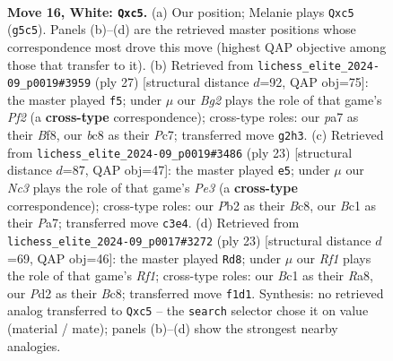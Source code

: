 \documentclass[11pt]{article}
\begin{document}
\clearpage

\begin{figure}[p]\centering
\begin{subfigure}{0.46\textwidth}\centering
\resizebox{\linewidth}{!}{%
\newchessgame
\chessboard[
  setfen={r1bq1r1k/pp1pppbp/3n4/2p3Q1/2P5/2N2N2/PP1P1PBP/R1B2RK1 w - - 5 16},
  showmover=false,
  pgfstyle=straightmove, color=movearrow, markmove={g5-c5}
]}
\caption{}
\end{subfigure}\hfill
\begin{subfigure}{0.46\textwidth}\centering
\resizebox{\linewidth}{!}{%
\newchessgame
\chessboard[
  setfen={2kr1b1r/pppb1pp1/2n4p/7q/3PB3/4PPP1/PPN4P/R1BQ1RK1 b - - 2 14},
  showmover=false,
  pgfstyle=straightmove, color=movearrow, markmove={f7-f5}
]}
\caption{}
\end{subfigure}
\\[4pt]
\begin{subfigure}{0.46\textwidth}\centering
\resizebox{\linewidth}{!}{%
\newchessgame
\chessboard[
  setfen={r1b2rk1/pp2bppp/3qpn2/8/2BN4/2P5/PP2QPPP/R1B2RK1 b - - 2 12},
  showmover=false,
  pgfstyle=straightmove, color=movearrow, markmove={e6-e5}
]}
\caption{}
\end{subfigure}\hfill
\begin{subfigure}{0.46\textwidth}\centering
\resizebox{\linewidth}{!}{%
\newchessgame
\chessboard[
  setfen={r1b2rk1/pp2bppp/3qpn2/8/3N4/1B6/PPP2PPP/R1BQR1K1 b - - 4 12},
  showmover=false,
  pgfstyle=straightmove, color=movearrow, markmove={f8-d8}
]}
\caption{}
\end{subfigure}
\caption{\textbf{Move 16, White: \texttt{Qxc5}.} (a) Our position; Melanie plays \texttt{Qxc5} (\texttt{g5c5}). Panels (b)--(d) are the retrieved master positions whose correspondence most drove this move (highest QAP objective among those that transfer to it). (b) Retrieved from \texttt{lichess\_elite\_2024-09\_p0019\#3959} (ply 27) [structural distance $d$=92, QAP obj=75]: the master played \texttt{f5}; under $\mu$ our \emph{Bg2} plays the role of that game's \emph{Pf2} (a \textbf{cross-type} correspondence); cross-type roles: our \emph{p}a7 as their \emph{B}f8, our \emph{b}c8 as their \emph{P}c7; transferred move \texttt{g2h3}. (c) Retrieved from \texttt{lichess\_elite\_2024-09\_p0019\#3486} (ply 23) [structural distance $d$=87, QAP obj=47]: the master played \texttt{e5}; under $\mu$ our \emph{Nc3} plays the role of that game's \emph{Pe3} (a \textbf{cross-type} correspondence); cross-type roles: our \emph{P}b2 as their \emph{B}c8, our \emph{B}c1 as their \emph{P}a7; transferred move \texttt{c3e4}. (d) Retrieved from \texttt{lichess\_elite\_2024-09\_p0017\#3272} (ply 23) [structural distance $d$=69, QAP obj=46]: the master played \texttt{Rd8}; under $\mu$ our \emph{Rf1} plays the role of that game's \emph{Rf1}; cross-type roles: our \emph{B}c1 as their \emph{R}a8, our \emph{P}d2 as their \emph{B}c8; transferred move \texttt{f1d1}. Synthesis: no retrieved analog transferred to \texttt{Qxc5} -- the \texttt{search} selector chose it on value (material / mate); panels (b)--(d) show the strongest nearby analogies.}
\label{fig:thought-m30}
\end{figure}
\end{document}
